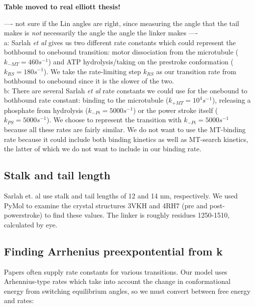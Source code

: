 \documentclass[10pt]{article} %
\begin{document}
\textbf{Table moved to real elliott thesis!}

---- not sure if the Lin angles are right, since measuring the angle that the tail makes is \textit{not} necessarily the angle the angle the linker makes ----\\

a: Sarlah \textit{et al} gives us two different rate constants which could represent the bothbound to onebound transition: motor dissociation from the microtubule ($k_{-MT} = 460 s^{-1}$) and ATP hydrolysis/taking on the prestroke conformation ($k_{RS} = 180 s^{-1}$). We take the rate-limiting step $k_{RS}$ as our transition rate from bothbound to onebound since it is the slower of the two.\\

b: There are several Sarlah \textit{et al} rate constants we could use for the onebound to bothbound rate constant: binding to the microtubule ($k_{+MT} = 10^4 s^{-1}$), releasing a phosphate from hydrolysis ($k_{-Pi} = 5000 s^{-1}$) or the power stroke itself ($k_{PS} = 5000 s^{-1}$). We choose to represent the transition with $k_{-Pi} = 5000 s^{-1}$ because all these rates are fairly similar. We do not want to use the MT-binding rate because it could include both binding kinetics as well as MT-search kinetics, the latter of which we do not want to include in our binding rate.\\

\subsection{Stalk and tail length}
Sarlah et. al use stalk and tail lengths of 12 and 14 nm, respectively. We used PyMol to examine the crystal structures 3VKH and 4RH7 (pre and post-powerstroke) to find these values. The linker is roughly residues 1250-1510, calculated by eye.\\

\subsection{Finding Arrhenius preexpontential from k}
Papers often supply rate constants for various transitions. Our model uses Arhennius-type rates which take into account the change in conformational energy from switching equilibrium angles, so we must convert between free energy and rates:
\end{document}
